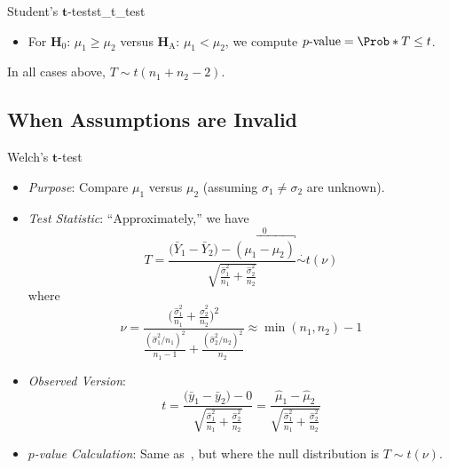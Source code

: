 \begin{Statistical_Test}{Student's $ \symbf{t} $-test}{st_t_test}
\begin{itemize}
\begin{itemize}
                              $ p\text{-value}=\Prob*{T\ge t} $.
                        \item For $ \mathbf{H}_0 $: $ \mu_1\ge\mu_2 $ versus $ \mathbf{H}_\text{A} $: $ \mu_1<\mu_2 $, we compute
                              $ p\text{-value}=\Prob*{T\le t} $.
                  \end{itemize}
                  \begin{Remark}{}{}
                        In all cases above, $ T \sim t(n_1+n_2-2) $.
                  \end{Remark}
      \end{itemize}
\end{Statistical_Test}
\subsection{When Assumptions are Invalid}
\begin{Statistical_Test}{Welch's $ \symbf{t} $-test}{}
      \begin{itemize}
            \item \emph{Purpose}: Compare $ \mu_1 $ versus $ \mu_2 $ (assuming $ \sigma_1\ne\sigma_2 $ are unknown).
            \item \emph{Test Statistic}: ``Approximately,'' we have
                  \[ T=\frac{\bigl(\bar{Y}_1-\bar{Y}_2\bigr)-\overbracket{(\mu_1-\mu_2)}^0}{\displaystyle \sqrt{\frac{\hat{\sigma}_1^2}{n_1}+\frac{\hat{\sigma}_2^2}{n_2}}}\stackrel{\cdot}{\sim} t(\nu) \]
                  where
                  \[ \nu=\frac{
                              \displaystyle \biggl(\frac{\hat{\sigma}_1^2}{n_1}+\frac{\hat{\sigma}_2^2}{n_2} \biggr)^{\!2}
                        }{
                              \displaystyle \frac{(\hat{\sigma}_1^2/n_1)^2}{n_1-1}+\frac{(\hat{\sigma}_2^2/n_2)^2}{n_2}
                        }\approx \min(n_1,n_2)-1  \]
            \item \emph{Observed Version}:
                  \[ t=\frac{\bigl(\bar{y}_1-\bar{y}_2\bigr)-0}{\displaystyle \sqrt{\frac{\hat{\sigma}_1^2}{n_1}+\frac{\hat{\sigma}_2^2}{n_2}}}=\frac{\hat{\mu}_1-\hat{\mu}_2}{\displaystyle \sqrt{\frac{\hat{\sigma}_1^2}{n_1}+\frac{\hat{\sigma}_2^2}{n_2}}}  \]
            \item \emph{$ p $-value Calculation}: Same as~, but where
                  the null distribution is $ T \sim t(\nu) $.
      \end{itemize}
\end{Statistical_Test}
